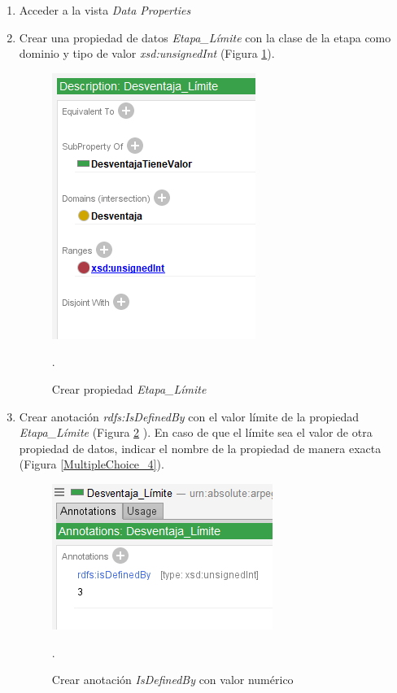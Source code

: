 \begin{enumerate}
    \item Acceder a la vista \textit{Data Properties}
    \item Crear una propiedad de datos \textit{Etapa\_Límite} con la clase de la etapa como dominio y tipo de valor 
    \textit{xsd:unsignedInt} (Figura \ref*{MultipleChoice_2}).
    \begin{figure}[H]
        \centering
        \includegraphics[scale=0.6]{Figures/Protege/MultipleChoice_2.png}
        \caption{Crear propiedad \textit{Etapa\_Límite}}.
        \label{MultipleChoice_2}
    \end{figure}
    \item Crear anotación \textit{rdfs:IsDefinedBy} con el valor límite de la propiedad \textit{Etapa\_Límite} 
    (Figura \ref*{MultipleChoice_3} ). En caso de que el límite sea el valor de otra propiedad de datos, indicar 
    el nombre de la propiedad de manera exacta (Figura \ref*{MultipleChoice_4}).
    \begin{figure}[H]
        \centering
        \includegraphics[scale=0.6]{Figures/Protege/MultipleChoice_3.png}
        \caption{Crear anotación \textit{IsDefinedBy} con valor numérico}.
        \label{MultipleChoice_3}
    \end{figure}

\end{enumerate}
